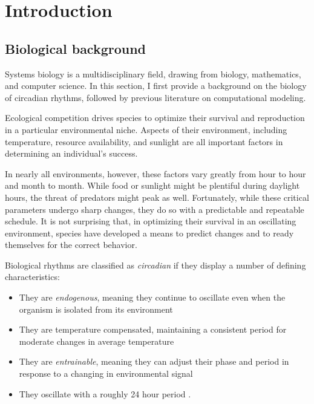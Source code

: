 \chapter{Introduction}
\section{Biological background}
Systems biology is a multidisciplinary field, drawing from biology, mathematics, and computer science. In this section, I first provide a background on the biology of circadian rhythms, followed by previous literature on computational modeling. 

Ecological competition drives species to optimize their survival and reproduction in a particular environmental niche. Aspects of their environment, including temperature, resource availability, and sunlight are all important factors in determining an individual's success.

In nearly all environments, however, these factors vary greatly from hour to hour and month to month. While food or sunlight might be plentiful during daylight hours, the threat of predators might peak as well. Fortunately, while these critical parameters undergo sharp changes, they do so with a predictable and repeatable schedule. It is not surprising that, in optimizing their survival in an oscillating environment, species have developed a means to predict changes and to ready themselves for the correct behavior.

Biological rhythms are classified as {\em circadian} if they display a number of defining characteristics:
\begin{itemize}
  \item They are {\em endogenous}, meaning they continue to oscillate even when the organism is isolated from its environment

  \item They are temperature compensated, maintaining a consistent period for moderate changes in average temperature

  \item They are {\em entrainable}, meaning they can adjust their phase and period in response to a changing in environmental signal

  \item They oscillate with a roughly 24 hour period \cite{Dunlap2009}.

\end{itemize}

